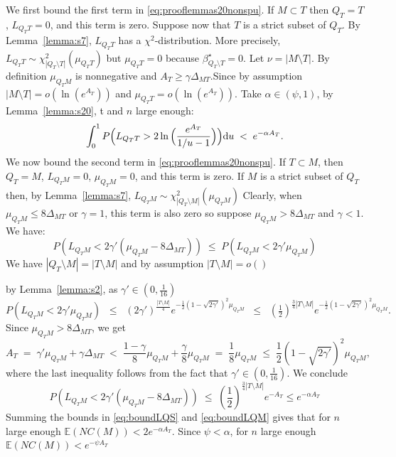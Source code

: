 \documentclass[aos]{imsart}
\theoremstyle{plain}
\newcommand{\E}{\mathbb{E}}
\begin{document}
\begin{supplement}
We first bound the first term in \eqref{eq:prooflemmas20nonspu}. If $M \subset T$ then $Q_T=T$, $L_{Q_TT}=0$, and this term is zero. Suppose now that $T$ is a strict subset of $Q_T$. By Lemma~\ref{lemma:s7}, $L_{Q_TT}$ has a $\chi^2$-distribution. More precisely, $L_{Q_TT} \sim \mathcal{\chi}_{|Q_T\setminus T|}^2(\mu_{Q_TT})$ {but $\mu_{Q_TT}=0$ because $\beta^\star_{Q_T\setminus T}=0$}. Let $\nu=|M\setminus T|$. By definition $\mu_{Q_TM}$ is nonnegative and $A_T \geq \gamma \Delta_{MT}$.Since by assumption $|M\setminus T|=o(\ln(e^{A_T}))$ and $\mu_{Q_TT}=o(\ln(e^{A_T}))$. Take $\alpha\in(\psi,1)$, by Lemma~\ref{lemma:s20}, t and $n$ large enough:
\begin{equation}\label{eq:boundLQS}
\int_0^1P\Bigl(L_{Q_TT}>2\ln{\Bigl(\frac{e^{A_T}}{1 / u-1}\Bigl)}\Bigl){\rm d}u \;<\; 
e^{-\alpha A_T}.
\end{equation}
We now bound the second term in \eqref{eq:prooflemmas20nonspu}. If $T \subset M$, then $Q_T=M$, $L_{Q_TM}=0$, $\mu_{Q_TM}=0$, and this term is zero. If $M$ is a strict subset of $Q_T$ then, by Lemma~\ref{lemma:s7}, $L_{Q_TM} \sim \chi_{|Q_T\setminus M|}^2(\mu_{Q_TM})$ %
Clearly, when $\mu_{Q_TM}\leq 8\Delta_{MT}$ or $\gamma = 1$, this term is also zero so suppose  $\mu_{Q_TM}> 8\Delta_{MT}$ and $\gamma <1$.  
We have:  
$$P\left(L_{Q_TM}<2\gamma'(\mu_{Q_TM}-8\Delta_{MT})\right)\; \leq \; P\left(L_{Q_TM}<2\gamma'\mu_{Q_TM}\right)$$ 
We have $|Q_T\setminus M|=|T\setminus M|$ and by assumption $|T\setminus M|=o()$ 

by Lemma~\ref{lemma:s2}, as $\gamma'\in (0,\tfrac{1}{16})$
$$P\left(L_{Q_TM}<2\gamma'\mu_{Q_TM}\right) \;\;\leq\;\; (2\gamma')^{\frac{|T\setminus M|}{4}} e^{-\frac{1}{2}(1-\sqrt{2\gamma'})^2\mu_{Q_TM}}\;\;\leq\;\;  (\tfrac12)^{\tfrac34|T\setminus M|}e^{-\frac{1}{2}(1-\sqrt{2\gamma'})^2\mu_{Q_TM}}.$$
Since $\mu_{Q_TM}>8\Delta_{MT}$, we get
$$
A_T\;=\;\gamma'\mu_{Q_TM}+\gamma\Delta_{MT}\;<\;\frac{1-\gamma}{8}\mu_{Q_TM}+\frac{\gamma}{8}\mu_{Q_TM}\;=\;\frac18\mu_{Q_TM}\;\leq\;\frac12(1-\sqrt{2\gamma'})^2\mu_{Q_TM},
$$
where the last inequality follows from the fact that $\gamma'\in(0, \tfrac{1}{16})$. We conclude
\begin{equation}\label{eq:boundLQM}
    P\left(L_{Q_TM}<2\gamma'(\mu_{Q_TM}-8\Delta_{MT})\right) \;\leq\; \left(\frac12\right)^{\tfrac34|T\setminus M|}e^{-A_T} \leq e^{-\alpha A_T}
\end{equation}
Summing the bounds in \eqref{eq:boundLQS} and \eqref{eq:boundLQM} gives that for $n$ large enough $\E\left(NC(M)\right) < 2e^{-\alpha A_T}$. Since $\psi<\alpha$, for $n$ large enough $\E\left(NC(M)\right) < e^{-\psi A_T}$



\end{supplement}
\end{document}
